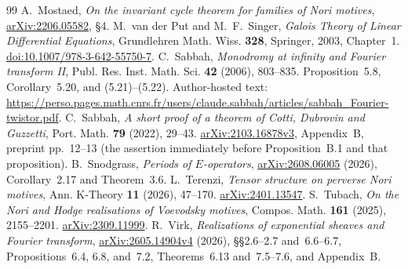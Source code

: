 \documentclass[11pt]{article}
\numberwithin{equation}{section}
\theoremstyle{definition}
\theoremstyle{remark}
\begin{document}
\begin{thebibliography}{99}
A.~Mostaed, \emph{On the invariant cycle theorem for families of Nori
motives}, \href{https://arxiv.org/abs/2206.05582}{arXiv:2206.05582}, \S4.
M.~van der Put and M.~F.~Singer, \emph{Galois Theory of Linear Differential
Equations}, Grundlehren Math. Wiss. \textbf{328}, Springer, 2003, Chapter~1.
\href{https://doi.org/10.1007/978-3-642-55750-7}{doi:10.1007/978-3-642-55750-7}.
C.~Sabbah, \emph{Monodromy at infinity and Fourier transform II},
Publ. Res. Inst. Math. Sci. \textbf{42} (2006), 803--835.
Proposition~5.8, Corollary~5.20, and (5.21)--(5.22). Author-hosted text:
\url{https://perso.pages.math.cnrs.fr/users/claude.sabbah/articles/sabbah_Fourier-twistor.pdf}.
C.~Sabbah, \emph{A short proof of a theorem of Cotti, Dubrovin and
Guzzetti}, Port. Math. \textbf{79} (2022), 29--43.
\href{https://arxiv.org/abs/2103.16878v3}{arXiv:2103.16878v3},
Appendix~B, preprint pp.~12--13 (the assertion immediately before
Proposition~B.1 and that proposition).
B.~Snodgrass, \emph{Periods of $E$-operators},
\href{https://arxiv.org/abs/2608.06005}{arXiv:2608.06005} (2026),
Corollary~2.17 and Theorem~3.6.
L.~Terenzi, \emph{Tensor structure on perverse Nori motives},
Ann. K-Theory \textbf{11} (2026), 47--170.
\href{https://arxiv.org/abs/2401.13547}{arXiv:2401.13547}.
S.~Tubach, \emph{On the Nori and Hodge realisations of Voevodsky motives},
Compos. Math. \textbf{161} (2025), 2155--2201.
\href{https://arxiv.org/abs/2309.11999}{arXiv:2309.11999}.
R.~Virk, \emph{Realizations of exponential sheaves and Fourier transform},
\href{https://arxiv.org/abs/2605.14904v4}{arXiv:2605.14904v4} (2026),
\S\S2.6--2.7 and~6.6--6.7, Propositions~6.4, 6.8, and~7.2,
Theorems~6.13 and~7.5--7.6, and Appendix~B.


\end{thebibliography}
\end{document}

